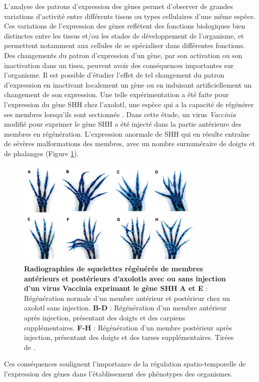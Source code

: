 L’analyse des patrons d’expression des gènes permet d’observer de grandes variations d’activité entre différents tissus ou types cellulaires d’une même espèce. Ces variations de l’expression des gènes reflètent des fonctions biologiques bien distinctes entre les tissus et/ou les stades de développement de l’organisme, et permettent notamment aux cellules de se spécialiser dans différentes fonctions. \\

Des changements du patron d’expression d’un gène, par son activation ou son inactivation dans un tissu, peuvent avoir des conséquences importantes sur l’organisme. Il est possible d'étudier l’effet de tel changement du patron d’expression en inactivant localement un gène ou en induisant artificiellement un changement de son expression. Une telle expérimentation a été faite pour l’expression du gène \acrshort{SHH} chez l’axolotl, une espèce qui a la capacité de régénérer ses membres lorsqu’ils sont sectionnés \citep{roy_vaccinia_2000}. Dans cette étude, un virus \textit{Vaccinia} modifié pour exprimer le gène \acrshort{SHH} a été injecté dans la partie antérieure des membres en régénération. L’expression anormale de \acrshort{SHH} qui en résulte entraîne de sévères malformations des membres, avec un nombre surnuméraire de doigts et de phalanges (Figure \ref{fig:Fig3}). \\

\begin{figure}[h]
    \centering
    \includegraphics[width=0.8\textwidth, page=1] {figures/introduction/fig3.png}
    \caption[Radiographies de squelettes régénérés de membres antérieurs et postérieurs d'axolotls avec ou sans injection d'un virus Vaccinia exprimant le gène \acrshort{SHH}.]{
    \textbf{Radiographies de squelettes régénérés de membres antérieurs et postérieurs d'axolotls avec ou sans injection d'un virus Vaccinia exprimant le gène \acrshort{SHH}} \textbf{A et E} :  Régénération normale d'un membre antérieur et postérieur chez un axolotl sans injection. \textbf{B-D} :  Régénération d'un membre antérieur après injection, présentant des doigts et des carpiens supplémentaires. \textbf{F-H} : Régénération d'un membre postérieur après injection, présentant des doigts et des tarses supplémentaires. Tirées de \citep{roy_vaccinia_2000}.\\
    }
    \label{fig:Fig3}
\end{figure} 

Ces conséquences soulignent l’importance de la régulation spatio-temporelle de l’expression des gènes dans l'établissement des phénotypes des organismes.

